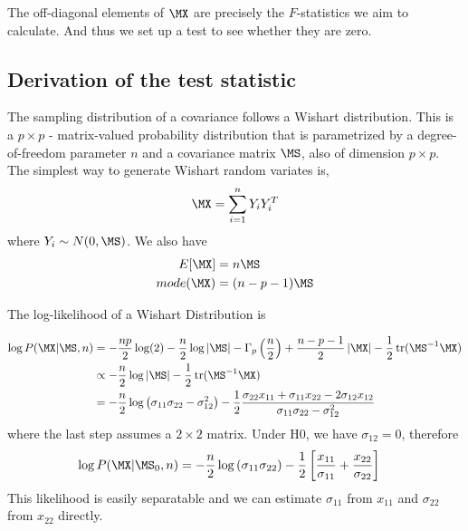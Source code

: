 \documentclass[12pt, letterpaper]{article}
\begin{document}
The off-diagonal elements of $\MX$ are precisely the $F$-statistics we aim to calculate. And thus we set up a test to see whether they are zero.


\subsection{Derivation of the test statistic}
The sampling distribution of a covariance follows a Wishart distribution. This is a $p \times p$ - matrix-valued probability distribution that is parametrized by a degree-of-freedom parameter $n$ and a covariance matrix $\MS$, also of dimension $p \times p$. The simplest way to generate Wishart random variates is, 
\begin{equation}
    \MX = \sum_{i=1}^n Y_i Y_i^T
\end{equation}
where $Y_i \sim N(0, \MS)$. We also have 
\begin{align}
    E[\MX] &= n\MS \\
    mode(\MX) &= (n-p-1) \MS
\end{align}

The log-likelihood of a Wishart Distribution is

\begin{align}
    \log P(\MX | \MS, n) &= -\frac{np}{2} \log(2) -  \frac{n}{2}\log\left|\MS\right| - \Gamma_p\left(\frac {n}{2}\right ) + \frac{n-p-1}{2} \left|\MX\right| -\frac{1}{2}\operatorname{tr}({\MS}^{-1}\MX)\\
    &\propto  -\frac{n}2\log\left|\MS\right|   -\frac{1}{2}\operatorname{tr}({\MS}^{-1}\MX)\nonumber\\
    &= -\frac{n}2 \log \left( \sigma_{11}\sigma_{22} - \sigma_{12}^2\right) - \frac{1}{2}\frac{\sigma_{22}x_{11} + \sigma_{11}x_{22} -2 \sigma_{12}x_{12}} {\sigma_{11}\sigma_{22} -  \sigma_{12}^2} 
\end{align}
where the last step assumes a $2\times 2$ matrix. 
Under H0, we have $\sigma_{12} = 0$, therefore
\begin{align}
    \log P(\MX | \MS_0, n) &= -\frac{n}2 \log \left( \sigma_{11}\sigma_{22}\right) - \frac{1}{2}\left[\frac{x_{11}}{\sigma_{11}}  + \frac{x_{22}}{\sigma_{22}}\right] 
\end{align}
This likelihood is easily separatable and we can estimate $\sigma_{11}$ from $x_{11}$ and $\sigma_{22}$ from $x_{22}$ directly.
\end{document}
